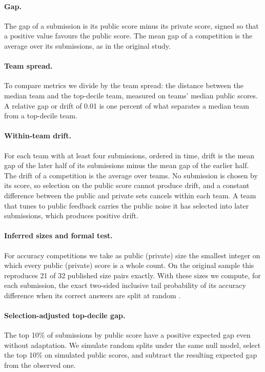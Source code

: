 \documentclass[10pt]{article}
\begin{document}
\paragraph{Gap.} The gap of a submission is its public score minus its private score, signed so that a positive value favours the public score. The mean gap of a competition is the average over its submissions, as in the original study.

\paragraph{Team spread.} To compare metrics we divide by the team spread: the distance between the median team and the top-decile team, measured on teams' median public scores. A relative gap or drift of 0.01 is one percent of what separates a median team from a top-decile team.

\paragraph{Within-team drift.} For each team with at least four submissions, ordered in time, drift is the mean gap of the later half of its submissions minus the mean gap of the earlier half. The drift of a competition is the average over teams. No submission is chosen by its score, so selection on the public score cannot produce drift, and a constant difference between the public and private sets cancels within each team. A team that tunes to public feedback carries the public noise it has selected into later submissions, which produces positive drift.

\paragraph{Inferred sizes and formal test.} For accuracy competitions we take as public (private) size the smallest integer on which every public (private) score is a whole count. On the original sample this reproduces 21 of 32 published size pairs exactly. With these sizes we compute, for each submission, the exact two-sided inclusive tail probability of its accuracy difference when its correct answers are split at random \citep{roelofs2019meta}.

\paragraph{Selection-adjusted top-decile gap.} The top 10\% of submissions by public score have a positive expected gap even without adaptation. We simulate random splits under the same null model, select the top 10\% on simulated public scores, and subtract the resulting expected gap from the observed one.
\end{document}
